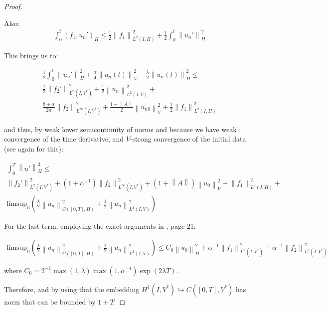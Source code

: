 \documentclass[english,a4paper,10pt,oneside]{scrbook}	%
\theoremstyle{break}
\newenvironment{mproof}[1][\proofname]{%
  \begin{proof}[#1]$ $\par\nobreak\ignorespaces
}{%
  \end{proof}
}
\renewcommand*{\proofname}{Proof}
\theoremstyle{remark}
\newcommand{\ds}{\displaystyle}
\newcommand{\norm}[1]{\left\lVert#1\right\rVert}
\newcommand{\HN}[1]{\norm{#1}_{H}}
\newcommand{\VN}[1]{\norm{#1}_{V}}
\newcommand{\emb}{\hookrightarrow}
\begin{document}
\begin{appendices}
\begin{mproof}
Also:
\begin{align*}
\int_0^t(f_1,u_n')_H\leq \frac{1}{2}\norm{f_1}_{L^2(I,H)}^2+\frac{1}{2}\int_0^t\HN{u_n'}^2
\end{align*}

This brings us to:

\begin{align}
\label{eqn:weak_der_bound}
\frac{1}{2}\int_0^t\HN{u_n'}^2+\frac{\alpha}{4}\VN{u_n(t)}^2-\frac{\lambda}{2}\HN{u_n(t)}^2\leq \\
\frac{1}{2}\norm{f_2'}_{L^2(I,V^*)}^2 + \frac{1}{2}\norm{u_n}_{L^2(I,V)}^2 +\\
\frac{8+\alpha}{2\alpha}\norm{f_2}_{L^\infty(I,V^*)}^2+\frac{1+\norm{A}}{2}\VN{u_{n0}}^2
+\frac{1}{2}\norm{f_1}_{L^2(I,H)}^2
\end{align}

and thus, by weak lower semicontinuity of norms and because we have weak convergence of the time derivative, and $V$-strong convergence of the initial data (see again \cite{gilardi} for this):

\begin{align*}
\int_0^T\HN{u'}^2\leq \\
\norm{f_2'}_{L^2(I,V^*)}^2+(1+\alpha^{-1})\norm{f_2}_{L^\infty(I,V^*)}^2+(1+\norm{A})\VN{u_{0}}^2+\norm{f_1}_{L^2(I,H)}^2+\\
\text{limsup}_n \left ( \frac{\lambda}{2}\norm{u_n}_{C([0,T],H)}^2 + \frac{1}{2}\norm{u_n}_{L^2(I,V)}^2 \right )
\end{align*}


For the last term, employing the exact arguments in \cite{gilardi}, page 21:

\begin{align}
\label{eqn:limsup}
\text{limsup}_n \left ( \frac{\lambda}{2}\norm{u_n}_{C([0,T],H)}^2 + \frac{1}{2}\norm{u_n}_{L^2(I,V)}^2 \right )\leq C_0\HN{u_0}^2+\alpha^{-1}\norm{f_1}^2_{L^2(I,V^*)}+\alpha^{-1}\norm{f_2}^2_{L^2(I,V^*)}
\end{align}


where $C_0 = \ds 2^{-1}\max(1,\lambda)\max(1,\alpha^{-1})\exp(2\lambda T)$.

Therefore, and by using that the embedding $H^1(I,V^*)\emb C([0,T],V^*)$ has norm that can be bounded by $1+T$:
%



\end{mproof}
\end{appendices}
\end{document}
